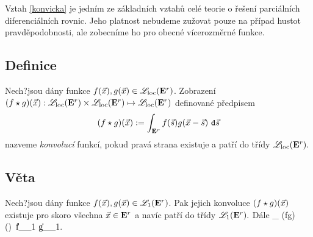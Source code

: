 Vztah \eqref{konvicka} je jedn\'im ze z\'akladn\'ich vztah\r u cel\'e teorie o \v re\v sen\'i parci\'aln\'ich diferenci\'aln\'ich rovnic. Jeho platnost nebudeme zu\v zovat pouze na p\v r\'ipad hustot pravd\v epodobnosti, ale zobecn\'ime ho pro obecn\'e v\'icerozm\v ern\'e funkce.

\subsection{Definice}\label{klasa-konvo}
Nech?jsou dány funkce $f({\vec{x}}),g({\vec{x}})\in \mathscr{L}_{\mathrm{loc}}{({{\mathbf E}^r})}$. Zobrazení
$(f\star g)({\vec{x}}):\mathscr{L}_{\mathrm{loc}}{({{\mathbf E}^r})} \times \mathscr{L}_{\mathrm{loc}}{({{\mathbf E}^r})}\mapsto \mathscr{L}_{\mathrm{loc}}{({{\mathbf E}^r})}$
definované předpisem
%
$$(f\star g)({\vec{x}}):=\int_{{{\mathbf E}^r}}f({\vec{s}})g({\vec{x}}-{\vec{s}})~\mathtt{d}{\vec{s}}$$
%
nazveme \emph{konvoluc\'i} funkcí, pokud pravá strana existuje a
patří do t\v r\'idy $\mathscr{L}_{\mathrm{loc}}{({{\mathbf E}^r})}.$

\subsection{Věta}\label{existuje_konvo}

Nech?jsou dány funkce $f({\vec{x}}),g({\vec{x}})\in {\mathscr L}_1{({{\mathbf E}^r})}$. Pak jejich konvoluce $(f\star g)({\vec{x}})$ existuje pro skoro v\v sechna ${\vec{x}}\in{{\mathbf E}^r}$ a nav\' ic patří do t\v r\'idy ${\mathscr L}_1{({{\mathbf E}^r})}.$ D\'ale 
%
\BE \int_{\Er} (f\star g)(\x)~\dxx \leq \|f\|_{\LLL_1} \cdot  \|g\|_{\LLL_1}. \label{zacapa} \EE

\Proof

